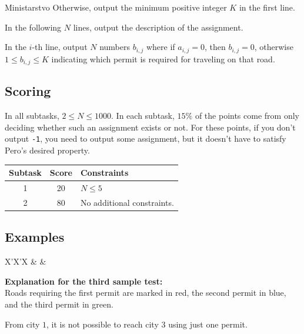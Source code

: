 \begin{statement}[
  problempoints=100,
  timelimit=1 second,
  memorylimit=1024 MiB,
]{Ministarstvo}
Otherwise, output the minimum positive integer $K$ in the first line.

In the following $N$ lines, output the description of the assignment.

In the $i$-th line, output $N$ numbers $b_{i, j}$ where if $a_{i, j} = 0$, then $b_{i, j} = 0$, otherwise $1 \leq b_{i, j} \leq K$ indicating which permit is required for traveling on that road. 

\subsection*{Scoring}

In all subtasks, $2 \leq N \leq 1000$. In each subtask, $15\%$ of the points come from only deciding whether such an assignment exists or not. For these points, if you don't output \texttt{-1}, you need to output some assignment, but it doesn't have to satisfy Pero's desired property. 

{\renewcommand{\arraystretch}{1.4}
  \setlength{\tabcolsep}{6pt}
  \begin{tabular}{ccl}
   Subtask & Score & Constraints \\ \midrule
    1 & 20 & $N \leq 5$  \\
    2 & 80 & No additional constraints. \\
\end{tabular}}

\subsection*{Examples}
\begin{tabularx}{\textwidth}{X'X'X}
 &
 &
\end{tabularx}

\textbf{Explanation for the third sample test:}\\

Roads requiring the first permit are marked in red, the second permit in blue, and the third permit in green.

From city $1$, it is not possible to reach city $3$ using just one permit.


\end{statement}
